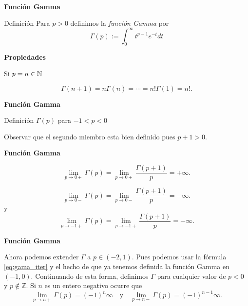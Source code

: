 \begin{frame}[fragile]{\textbf{Función Gamma}}


\begin{block}{Definición} Para $p>0$ definimos la \emph{función Gamma} por
\begin{equation}\label{eq:gamma}\Gamma(p):=\int_0^{\infty}t^{p-1}e^{-t}dt
\end{equation}
\end{block}


\textbf{Propiedades}
 
Si $p=n\in\mathbb{N}$ 

\[\Gamma(n+1)=n\Gamma(n)=\cdots=n!\Gamma(1)=n!.\]
\end{frame}



\begin{frame}[fragile]{\textbf{Función Gamma}}



\begin{block}{Definición $\Gamma(p)$ para $-1<p<0$}
 

Observar que el segundo miembro esta bien definido pues $p+1>0$. 

\end{block}
\end{frame}



\begin{frame}[fragile]{\textbf{Función Gamma}}

\[\lim_{p\to 0+}\Gamma(p)=\lim_{p\to 0+}\frac{\Gamma(p+1)}{p}=+\infty.\]

\[\lim_{p\to 0-}\Gamma(p)=\lim_{p\to 0-}\frac{\Gamma(p+1)}{p}=-\infty.\]
y
\[\lim_{p\to -1+}\Gamma(p)=\lim_{p\to -1+}\frac{\Gamma(p+1)}{p}=-\infty.\]

\end{frame}



\begin{frame}[fragile]{\textbf{Función Gamma}}


Ahora podemos extender $\Gamma$ a $p\in (-2,1)$. Pues  podemos usar la fórmula \eqref{eq:gama_iter} y el hecho de que ya tenemos definida la función Gamma en $(-1,0)$. Continuando de esta forma, definimos $\Gamma$ para cualquier valor de $p<0$ y $p\notin \mathbb{Z}$. Si $n$ es un entero negativo ocurre que
\[\lim_{p\to n+}\Gamma(p)=(-1)^n\infty\quad\text{y}\quad \lim_{p\to n-}\Gamma(p)=(-1)^{n-1}\infty.\]


\end{frame}



